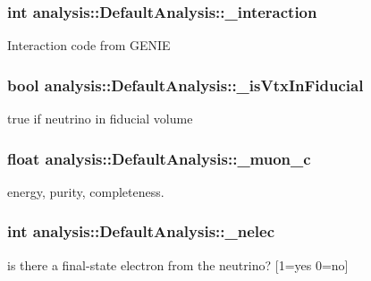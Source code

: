 \subsubsection[{\texorpdfstring{\+\_\+interaction}{_interaction}}]{\setlength{\rightskip}{0pt plus 5cm}int analysis\+::\+Default\+Analysis\+::\+\_\+interaction\hspace{0.3cm}{\ttfamily [private]}}\hypertarget{classanalysis_1_1DefaultAnalysis_a35c01b4be6d678e89cada927ab2ba45c}{}\label{classanalysis_1_1DefaultAnalysis_a35c01b4be6d678e89cada927ab2ba45c}
Interaction code from G\+E\+N\+IE 
\subsubsection[{\texorpdfstring{\+\_\+is\+Vtx\+In\+Fiducial}{_isVtxInFiducial}}]{\setlength{\rightskip}{0pt plus 5cm}bool analysis\+::\+Default\+Analysis\+::\+\_\+is\+Vtx\+In\+Fiducial\hspace{0.3cm}{\ttfamily [private]}}\hypertarget{classanalysis_1_1DefaultAnalysis_a3235e005677abb89da08d1668257bca3}{}\label{classanalysis_1_1DefaultAnalysis_a3235e005677abb89da08d1668257bca3}
true if neutrino in fiducial volume 
\subsubsection[{\texorpdfstring{\+\_\+muon\+\_\+c}{_muon_c}}]{\setlength{\rightskip}{0pt plus 5cm}float analysis\+::\+Default\+Analysis\+::\+\_\+muon\+\_\+c\hspace{0.3cm}{\ttfamily [private]}}\hypertarget{classanalysis_1_1DefaultAnalysis_ac6226239ce3915d1363f8038583e8960}{}\label{classanalysis_1_1DefaultAnalysis_ac6226239ce3915d1363f8038583e8960}
energy, purity, completeness. 
\subsubsection[{\texorpdfstring{\+\_\+nelec}{_nelec}}]{\setlength{\rightskip}{0pt plus 5cm}int analysis\+::\+Default\+Analysis\+::\+\_\+nelec\hspace{0.3cm}{\ttfamily [private]}}\hypertarget{classanalysis_1_1DefaultAnalysis_a6aa372d8781339f60a044c92d974ae53}{}\label{classanalysis_1_1DefaultAnalysis_a6aa372d8781339f60a044c92d974ae53}
is there a final-\/state electron from the neutrino? \mbox{[}1=yes 0=no\mbox{]} 
